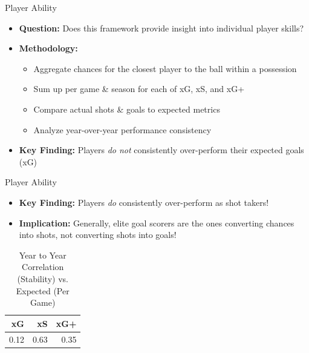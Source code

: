 \documentclass{beamer}
\begin{document}
\begin{frame}{Player Ability}
\begin{itemize}
\item \textbf{Question:} Does this framework provide insight into individual player skills?
\item \textbf{Methodology:}
  \begin{itemize}
  \item Aggregate chances for the closest player to the ball within a possession
  \item Sum up per game \& season for each of xG, xS, and xG+
  \item Compare actual shots \& goals to expected metrics
  \item Analyze year-over-year performance consistency
  \end{itemize}
\item \textbf{Key Finding:} Players \emph{do not} consistently over-perform their expected goals (xG)
\end{itemize}
\end{frame}

\begin{frame}{Player Ability}
\begin{itemize}
\item \textbf{Key Finding:} Players \emph{do} consistently over-perform as shot takers!
\item \textbf{Implication:} Generally, elite goal scorers are the ones converting chances into shots, not converting shots into goals!
\end{itemize}

\begin{table}[!h]
\centering
\caption{Year to Year Correlation (Stability) vs. Expected (Per Game)}
\begin{tabular}[t]{rrr}
\toprule
xG & xS & xG+\\
\midrule
0.12 & 0.63 & 0.35\\
\bottomrule
\end{tabular}
\end{table}
\end{frame}
\end{document}
